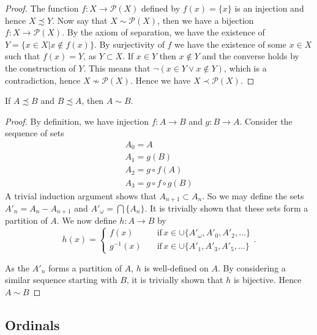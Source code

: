 \documentclass[]{article}
\begin{document}
\begin{proof}
The function $f: X \to \mathcal{P}(X)$ defined by $f(x) = \{x\}$ is an injection and hence $X \precsim Y$. Now say that $X \sim \mathcal{P}(X)$, then we have a bijection $f: X \to \mathcal{P}(X)$. By the axiom of separation, we have the existence of $Y = \{x \in X | x \not \in f(x)\}$. By surjectivity of  $f$ we have the existence of some $x \in X$ such that $f(x) = Y$, as  $Y \subset X$. If $x \in Y$ then $x \not\in Y$ and the converse holds by the construction of $Y$. This means that $\lnot (x \in Y \lor x \not\in Y)$, which is a contradiction, hence  $X \not\sim \mathcal{P}(X)$. Hence we have $X \prec \mathcal{P}(X)$.
\end{proof}

\begin{thm}  \label{thm:cantor-bernstein}
	If $A \precsim B$ and $B \precsim A$, then $A \sim B$.
\end{thm}

\begin{proof}
	By definition, we have injection  $f: A \to B$ and $g: B \to A$. Consider the sequence of sets 
	\begin{align*}
			A_0 = A \\
			A_1 = g(B) \\
			A_2 = g \circ f(A)\\
			A_3 = g \circ f \circ g(B)
	\end{align*}
	A trivial induction argument shows that $A_{n+1} \subset A_n$. So we may define the sets $A'_n = A_n - A_{n+1}$ and $A'_{\omega} = \bigcap\{A_n\}$. It is trivially shown that these sets form a partition of  $A$. We now define $h: A \to B$ by 
	\[
				h(x) = \begin{cases}
						f(x) \quad &\text{if} \, x \in \cup\{A'_{\omega}, A'_0, A'_2, \ldots\} \\
						g^{-1}(x) \quad &\text{if} \, x \in \cup\{A'_1, A'_3, A'_5, \ldots\}
				\end{cases}
	.\] 

	As the $A'_n$ forms a partition of $A$, $h$ is well-defined on $A$. By considering a similar sequence starting with $B$, it is trivially shown that $h$ is bijective. Hence $A \sim B$
\end{proof}

\subsection{Ordinals}
\end{document}
